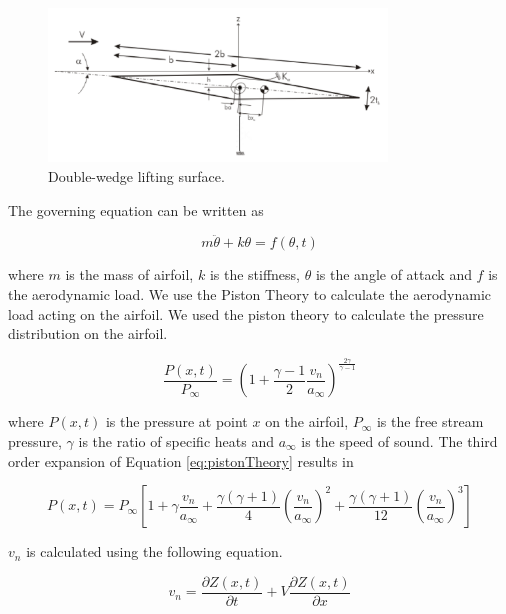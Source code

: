 \documentclass[12pt, a4paper]{extarticle}
\begin{document}
\begin{figure}[H]
	\centering
	\includegraphics[width=9.00cm]{figure/doubleWedgeAirfoil.png}
	\caption{Double-wedge lifting surface.}
	\label{fig:doubleWedgedAirfoil}
\end{figure}

The governing equation can be written as

\begin{equation}\label{eq:GE}
	m\ddot{\theta} + k \theta = f(\theta, t)
\end{equation}

where $m$ is the mass of airfoil, $k$ is the stiffness, $\theta$ is the angle of attack and $f$ is the aerodynamic load. We use the Piston Theory to calculate the aerodynamic load acting on the airfoil. We used the piston theory to calculate the pressure distribution on the airfoil.

\begin{equation}\label{eq:pistonTheory}
	\frac{P(x, t)}{P_\infty} = \left( 1+ \frac{\gamma - 1}{2} \frac{v_n}{a_\infty} \right)^{\frac{2 \gamma}{\gamma - 1}}
\end{equation}

where $P(x, t)$ is the pressure at point $x$ on the airfoil, $P_\infty$ is the free stream pressure, $\gamma$ is the ratio of specific heats and $a_\infty$ is the speed of sound. The third order expansion of Equation \eqref{eq:pistonTheory} results in

\begin{equation}
	P(x,t) = P_\infty
	\left[
	1 +
	\gamma \frac{v_n}{a_\infty} + 
	\frac{\gamma (\gamma + 1)}{4} \left( \frac{v_n}{a_\infty} \right)^2 + 
	\frac{\gamma (\gamma + 1)}{12} \left( \frac{v_n}{a_\infty} \right)^3
	\right]
\end{equation}

$v_n$ is calculated using the following equation.

\begin{equation}\label{eq:definitionOfVn}
	v_n = \frac{\partial Z(x,t)}{\partial t} + V \frac{\partial Z(x,t)}{\partial x}
\end{equation}
\end{document}
